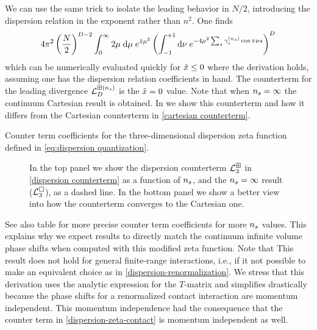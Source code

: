 We can use the same trick to isolate the leading behavior in $N/2$, introducing the dispersion relation in the exponent rather than $n^2$.
One finds
\begin{equation}
    \label{eq:dispersion counterterm}
    4 \pi^2 \left(\frac{N}{2}\right)^{D-2}\int_{0}^{\infty} 2\mu\; \mathrm{d}\mu\; e^{\tilde{x}\mu^2}\left(\int_{-1}^{+1} \mathrm{d}\nu\; e^{-4\mu^2 \sum_s \gamma_s^{({n_s})} \cos \pi \nu s}\right)^D
\end{equation}
which can be numerically evaluated quickly for $\tilde{x}\leq0$ where the derivation holds, assuming one has the dispersion relation coefficients in hand.
The counterterm for the leading divergence $\mathcal{L}_D^{\boxplus ({n_s})}$ is the $\tilde{x}=0$ value.
Note that when ${n_s}=\infty$ the continuum Cartesian result is obtained.
In  we show this counterterm and how it differs from the Cartesian counterterm in \eqref{cartesian counterterm}.

\begin{table}[htb]
    
    \caption{
    	\label{tab:diserpersion-zeta-3d-counterterm-counterterm}
		Counter term coefficients for the three-dimensional dispersion zeta function defined in \eqref{eq:dispersion quantization}.
    }
\end{table}

\begin{figure}[htb]
    
    \caption{
    	In the top panel we show the dispersion counterterm $\mathcal{L}^{\boxplus}_{3}$ in \eqref{dispersion counterterm} as a function of ${n_s}$, and the ${n_s}=\infty$ result ($\mathcal{L}^{\square}_3$), as a dashed line.
	In the bottom panel we show a better view into how the counterterm converges to the Cartesian one.
    }
    \label{fig:nstep counterterm}
\end{figure}




See also table  for more precise counter term coefficients for more ${n_s}$ values.
This explains why we expect results to directly match the continuum infinite volume phase shifts when computed with this modified zeta function.
Note that This result does not hold for general finite-range interactions, i.e., if it not possible to make an equivalent choice as in \eqref{dispersion-renormalization}.
We stress that this derivation uses the analytic  expression for the $T$-matrix and simplifies drastically because the phase shifts for a renormalized contact interaction are momentum independent.
This momentum independence had the consequence that the counter term in \eqref{dispersion-zeta-contact} is momentum independent as well.




